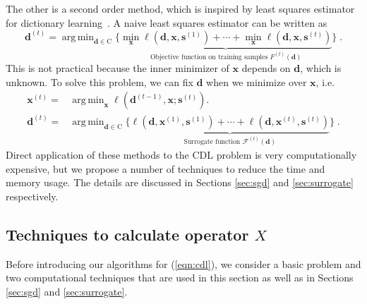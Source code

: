 \documentclass[final]{siamart1116}
\newcommand{\mb}[1]{\mathbf{#1}}
\DeclareMathOperator*{\argmin}{arg\,min}
\def \F  {\mathcal{F}}
\begin{document}
The other is a second order method, which is inspired by least squares estimator for dictionary learning~\cite{mairal2009online, skretting-2010-recursive, szabo2011online, zhang2012online, slavakis2014online, zhang2015online, kasiviswanathan2012online}.  A naive least squares estimator can be written as
\[
\mb{d}^{(t)} = \argmin_{\mb{d}\in\text{C}}\Big\{ \underbrace{\min_{\mb{x}}\ell(\mb{d},\mb{x},\mb{s}^{(1)}) + \cdots + \min_{\mb{x}}\ell(\mb{d},\mb{x},\mb{s}^{(t)})}_{\text{Objective function on training samples $F^{(t)}(\mb{d})$}} \Big\} \;.
\]
This is not practical because the inner minimizer of $\mb{x}$ depends on $\mb{d}$, which is unknown.
To solve this problem, we can fix $\mb{d}$ when we minimize over $\mb{x}$, i.e.
\begin{subequations}
\begin{align}
\mb{x}^{(t)} =& \argmin_{\mb{x}} \ell(\mb{d}^{(t-1)},\mb{x};\mb{s}^{(t)}).\label{eqn:cbpdn_t}\\
\mb{d}^{(t)} =& \argmin_{\mb{d}\in\text{C}} \Big\{ \underbrace{\ell(\mb{d},\mb{x}^{(1)},\mb{s}^{(1)}) + \cdots + \ell(\mb{d},\mb{x}^{(t)},\mb{s}^{(t)})}_{\text{Surrogate function } \F^{(t)}(\mb{d})} \Big\} \;.
\end{align}
\label{eqn:surro}
\end{subequations}
Direct application of these methods to the CDL problem is very computationally expensive, but we propose a number of techniques to reduce the time and memory usage.  The details are discussed in Sections \ref{sec:sgd} and \ref{sec:surrogate} respectively.


\subsection{Techniques to calculate operator $X$}
\label{sec:freq}

Before introducing our algorithms for (\ref{eqn:cdl}), we consider a basic problem and two computational techniques that are used in this section as well as in Sections \ref{sec:sgd} and \ref{sec:surrogate}.
\end{document}
